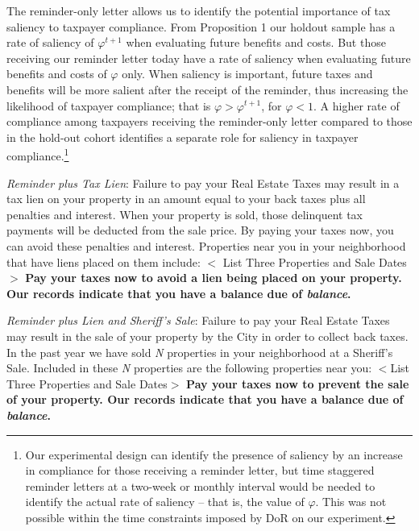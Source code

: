 \bigskip

 The reminder-only letter allows us to identify the potential
 importance of tax saliency to taxpayer compliance.  From Proposition 1 our holdout sample has a rate of saliency of
 $\varphi^{t+1}$ when evaluating future benefits and costs.  But those
 receiving our reminder letter today have a rate of saliency when
 evaluating future benefits and costs of $\varphi$ only.  When
 saliency is important, future taxes and benefits will be more salient
 after the receipt of the reminder, thus increasing the likelihood of
 taxpayer compliance; that is $\varphi>\varphi^{t+1}$, for $\varphi<1$. A higher rate of compliance among taxpayers
 receiving the reminder-only letter compared to those in the hold-out
 cohort identifies a separate role for saliency in taxpayer
 compliance.\footnote{Our experimental design can identify the
   presence of saliency by an increase in compliance for those
   receiving a reminder letter, but time staggered reminder letters at
   a two-week or monthly interval would be needed to identify the
   actual rate of saliency -- that is, the value of $\varphi$.  This
   was not possible within the time constraints imposed by DoR on our
   experiment.  }
   
\bigskip

\noindent \textit{Reminder plus Tax Lien}: Failure to pay your Real
Estate Taxes may result in a tax lien on your property in an amount
equal to your back taxes plus all penalties and interest.  When your
property is sold, those delinquent tax payments will be deducted from
the sale price.  By paying your taxes now, you can avoid these
penalties and interest.  Properties near you in your neighborhood that
have liens placed on them include: $<$ List Three Properties and Sale
Dates $>$ \textbf{Pay your taxes now to avoid a lien being placed on
  your property.  Our records indicate that you have a balance due of
  \textit{balance}.  }

\bigskip

\noindent \textit{Reminder plus Lien and Sheriff's Sale}: Failure to
pay your Real Estate Taxes may result in the sale of your property by
the City in order to collect back taxes.  In the past year we have
sold \textit{N} properties in your neighborhood at a Sheriff's Sale.
Included in these \textit{N} properties are the following properties
near you: $<$List Three Properties and Sale Dates$>$ \textbf{Pay your
  taxes now to prevent the sale of your property.  Our records
  indicate that you have a balance due of \textit{balance}.}

